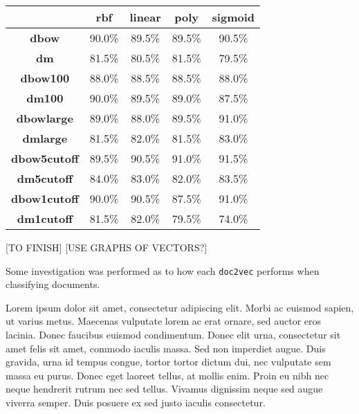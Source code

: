 \documentclass[twocolumn]{article}
\begin{document}
\begin{table*}[]
\centering
\captionsetup{justification=centering}
\caption{Table of accuracy achieved on the blind test set for \texttt{doc2vec} models}
\label{table:doc2vecaccs}
\begin{tabular}{|c|c|c|c|c|}
\hline
                     & \textbf{rbf} & \textbf{linear} & \textbf{poly} & \textbf{sigmoid} \\ \hline
\textbf{dbow}        & 90.0\%       & 89.5\%          & 89.5\%        & 90.5\%                \\ \hline
\textbf{dm}          & 81.5\%       & 80.5\%          & 81.5\%        & 79.5\%               \\ \hline
\textbf{dbow100}     & 88.0\%       & 88.5\%          & 88.5\%        & 88.0\%                \\ \hline
\textbf{dm100}       & 90.0\%       & 89.5\%          & 89.0\%        & 87.5\%                \\ \hline
\textbf{dbowlarge}   & 89.0\%       & 88.0\%          & 89.5\%        & 91.0\%                \\ \hline
\textbf{dmlarge}     & 81.5\%       & 82.0\%          & 81.5\%        & 83.0\%                \\ \hline
\textbf{dbow5cutoff} & 89.5\%       & 90.5\%          & 91.0\%        & 91.5\%                \\ \hline
\textbf{dm5cutoff}   & 84.0\%       & 83.0\%          & 82.0\%        & 83.5\%                \\ \hline
\textbf{dbow1cutoff} & 90.0\%       & 90.5\%          & 87.5\%        & 91.0\%                \\ \hline
\textbf{dm1cutoff}   & 81.5\%       & 82.0\%          & 79.5\%        & 74.0\%                \\ \hline
\end{tabular}
\end{table*}

[TO FINISH]
[USE GRAPHS OF VECTORS?]

Some investigation was performed as to how each \texttt{doc2vec} performs when classifying documents.

Lorem ipsum dolor sit amet, consectetur adipiscing elit. Morbi ac euismod sapien, ut varius metus. Maecenas vulputate lorem ac erat ornare, sed auctor eros lacinia. Donec faucibus euismod condimentum. Donec elit urna, consectetur sit amet felis sit amet, commodo iaculis massa. Sed non imperdiet augue. Duis gravida, urna id tempus congue, tortor tortor dictum dui, nec vulputate sem massa eu purus. Donec eget laoreet tellus, at mollis enim. Proin eu nibh nec neque hendrerit rutrum nec sed tellus. Vivamus dignissim neque sed augue viverra semper. Duis posuere ex sed justo iaculis consectetur.
\end{document}
